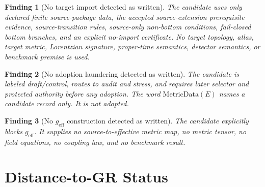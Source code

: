 \documentclass[11pt]{article}
\newcommand{\geff}{g_{\mathrm{eff}}}
\newtheorem{finding}{Finding}
\begin{document}
\begin{finding}[No target import detected as written]
The candidate uses only declared finite source-package data, the accepted
source-extension prerequisite evidence, source-transition rules, source-only
non-bottom conditions, fail-closed bottom branches, and an explicit no-import
certificate. No target topology, atlas, target metric, Lorentzian signature,
proper-time semantics, detector semantics, or benchmark premise is used.
\end{finding}

\begin{finding}[No adoption laundering detected as written]
The candidate is labeled draft/control, routes to audit and stress, and
requires later selector and protected authority before any adoption. The word
\(\mathrm{MetricData}(E)\) names a candidate record only. It is not adopted.
\end{finding}

\begin{finding}[No \(\geff\) construction detected as written]
The candidate explicitly blocks \(\geff\). It supplies no source-to-effective
metric map, no metric tensor, no field equations, no coupling law, and no
benchmark result.
\end{finding}

\section{Distance-to-GR Status}
\end{document}
